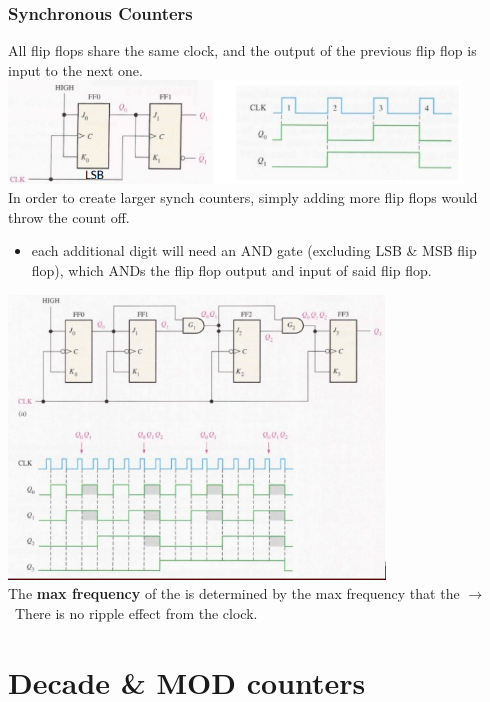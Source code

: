 \documentclass[a4paper,12pt]{article}
\newcommand{\ra}{$\rightarrow$}
\begin{document}
        \subsubsection{Synchronous Counters}
            All flip flops share the same clock, and the output of the previous flip flop is input to the next one.\\
            \includegraphics[width=12cm]{synchronousCounter1.png}\\
            In order to create larger synch counters, simply adding more flip flops would throw the count off.
            \begin{itemize}
                \item each additional digit will need an AND gate (excluding LSB \& MSB flip flop), which ANDs the flip flop output and input of said flip flop.
            \end{itemize}
            \includegraphics[width=10cm]{AddingDigits.png}\\
            The \textbf{max frequency} of the  is determined by the max frequency that the  \ra~There is no ripple effect from the clock.

    \section{Decade \& MOD counters}
\end{document}
